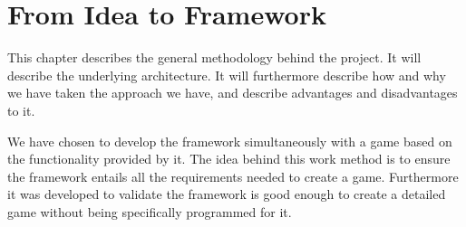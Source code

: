 \chapter{From Idea to Framework}

This chapter describes the general methodology behind the project. It will describe the underlying architecture. It will furthermore describe how and why we have taken the approach we have, and describe advantages and disadvantages to it.

We have chosen to develop the framework simultaneously with a game based on the functionality provided by it. The idea behind this work method is to ensure the framework entails all the requirements needed to create a game. Furthermore it was developed to validate the framework is good enough to create a detailed game without being specifically programmed for it.





